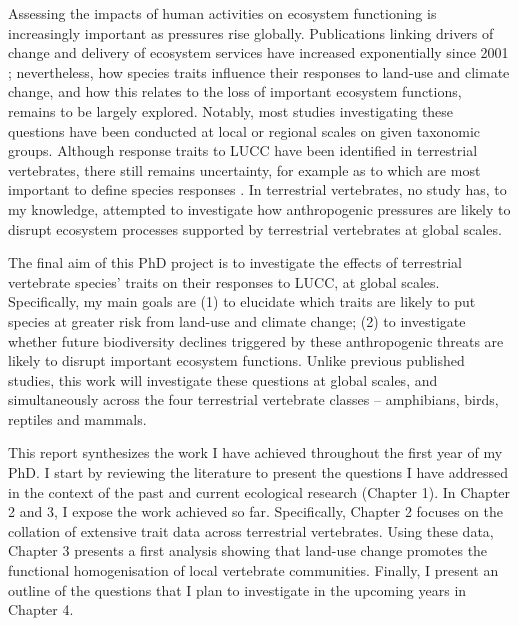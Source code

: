 Assessing the impacts of human activities on ecosystem functioning is increasingly important as pressures rise globally. Publications linking drivers of change and delivery of ecosystem services have increased exponentially since 2001 \citep{Hevia2017}; nevertheless, how species traits influence their responses to land-use and climate change, and how this relates to the loss of important ecosystem functions, remains to be largely explored.  Notably, most studies investigating these questions have been conducted at local or regional scales on given taxonomic groups. Although response traits to LUCC have been identified in terrestrial vertebrates, there still remains uncertainty, for example as to which are most important to define species responses \citep{Wheatley2017}. In terrestrial vertebrates, no study has, to my knowledge, attempted to investigate how anthropogenic pressures are likely to disrupt ecosystem processes supported by terrestrial vertebrates at global scales.
 
The final aim of this PhD project is to investigate the effects of terrestrial vertebrate species’ traits on their responses to LUCC, at global scales. Specifically, my main goals are (1) to elucidate which traits are likely to put species at greater risk from land-use and climate change; (2) to investigate whether future biodiversity declines triggered by these anthropogenic threats are likely to disrupt important ecosystem functions. Unlike previous published studies, this work will investigate these questions at global scales, and simultaneously across the four terrestrial vertebrate classes – amphibians, birds, reptiles and mammals.  

This report synthesizes the work I have achieved throughout the first year of my PhD. I start by reviewing the literature to present the questions I have addressed in the context of the past and current ecological research (Chapter 1). In Chapter 2 and 3, I expose the work achieved so far. Specifically, Chapter 2 focuses on the collation of extensive trait data across terrestrial vertebrates. Using these data, Chapter 3 presents a first analysis showing that land-use change promotes the functional homogenisation of local vertebrate communities. Finally, I present an outline of the questions that I plan to investigate in the upcoming years in Chapter 4.

